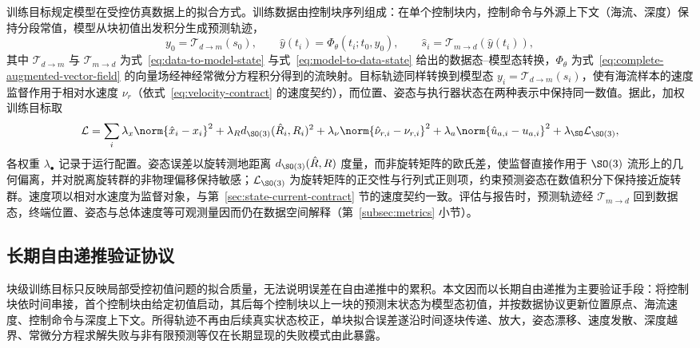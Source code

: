 训练目标规定模型在受控仿真数据上的拟合方式。训练数据由控制块序列组成：在单个控制块内，控制命令与外源上下文（海流、深度）保持分段常值，模型从块初值出发积分生成预测轨迹，
\begin{equation}
  y_0=\mathcal{T}_{d\to m}(s_0),\qquad
  \hat y(t_i)=\Phi_\theta(t_i;t_0,y_0),\qquad
  \hat s_i=\mathcal{T}_{m\to d}(\hat y(t_i)),
  \label{eq:block-prediction}
\end{equation}
其中 \(\mathcal{T}_{d\to m}\) 与 \(\mathcal{T}_{m\to d}\) 为式~\eqref{eq:data-to-model-state} 与式~\eqref{eq:model-to-data-state} 给出的数据态--模型态转换，\(\Phi_\theta\) 为式~\eqref{eq:complete-augmented-vector-field} 的向量场经神经常微分方程积分得到的流映射。目标轨迹同样转换到模型态 \(y_i=\mathcal{T}_{d\to m}(s_i)\)，使有海流样本的速度监督作用于相对水速度 \(\nu_r\)（依式~\eqref{eq:velocity-contract} 的速度契约），而位置、姿态与执行器状态在两种表示中保持同一数值。据此，加权训练目标取
\begin{equation}
  \mathcal{L}
  =
  \sum_i
  \lambda_x\norm{\hat x_i-x_i}^2
  +\lambda_R d_{\SO(3)}(\hat R_i,R_i)^2
  +\lambda_\nu\norm{\hat\nu_{r,i}-\nu_{r,i}}^2
  +\lambda_a\norm{\hat u_{a,i}-u_{a,i}}^2
  +\lambda_{\SO}\mathcal{L}_{\SO(3)} ,
  \label{eq:training-loss}
\end{equation}
各权重 \(\lambda_\bullet\) 记录于运行配置。姿态误差以旋转测地距离 \(d_{\SO(3)}(\hat R,R)\) 度量，而非旋转矩阵的欧氏差，使监督直接作用于 \(\SO(3)\) 流形上的几何偏离，并对脱离旋转群的非物理偏移保持敏感；\(\mathcal{L}_{\SO(3)}\) 为旋转矩阵的正交性与行列式正则项，约束预测姿态在数值积分下保持接近旋转群。速度项以相对水速度为监督对象，与第~\ref{sec:state-current-contract} 节的速度契约一致。评估与报告时，预测轨迹经 \(\mathcal{T}_{m\to d}\) 回到数据态，终端位置、姿态与总体速度等可观测量因而仍在数据空间解释（第~\ref{subsec:metrics} 小节）。

\subsection{长期自由递推验证协议}
\label{subsec:rollout-protocol}

块级训练目标只反映局部受控初值问题的拟合质量，无法说明误差在自由递推中的累积。本文因而以长期自由递推为主要验证手段：将控制块依时间串接，首个控制块由给定初值启动，其后每个控制块以上一块的预测末状态为模型态初值，并按数据协议更新位置原点、海流速度、控制命令与深度上下文。所得轨迹不再由后续真实状态校正，单块拟合误差遂沿时间逐块传递、放大，姿态漂移、速度发散、深度越界、常微分方程求解失败与非有限预测等仅在长期显现的失败模式由此暴露。

